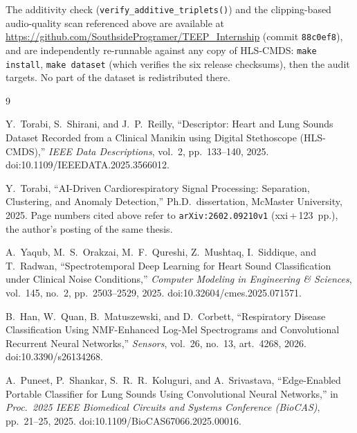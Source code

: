 \documentclass[11pt]{article}
\begin{document}
The additivity check (\texttt{verify\_additive\_triplets()}) and the
clipping-based audio-quality scan referenced above are available at
\url{https://github.com/SouthsideProgramer/TEEP_Internship} (commit
\texttt{88c0ef8}), and are independently re-runnable against any copy of
HLS-CMDS: \texttt{make install}, \texttt{make dataset} (which verifies the
six release checksums), then the audit targets. No part of the dataset is
redistributed there.

\begin{thebibliography}{9}

Y.~Torabi, S.~Shirani, and J.~P.~Reilly, ``Descriptor: Heart and Lung Sounds
Dataset Recorded from a Clinical Manikin using Digital Stethoscope
(HLS-CMDS),'' \textit{IEEE Data Descriptions}, vol.~2, pp.~133--140, 2025.
doi:10.1109/IEEEDATA.2025.3566012.

Y.~Torabi, ``AI-Driven Cardiorespiratory Signal Processing: Separation,
Clustering, and Anomaly Detection,'' Ph.D.\ dissertation, McMaster
University, 2025. Page numbers cited above refer to
\texttt{arXiv:2602.09210v1} (xxi\,+\,123~pp.), the author's posting of the
same thesis.

A.~Yaqub, M.~S.~Orakzai, M.~F.~Qureshi, Z.~Mushtaq, I.~Siddique, and
T.~Radwan, ``Spectrotemporal Deep Learning for Heart Sound Classification
under Clinical Noise Conditions,'' \textit{Computer Modeling in
Engineering \& Sciences}, vol.~145, no.~2, pp.~2503--2529, 2025.
doi:10.32604/cmes.2025.071571.

B.~Han, W.~Quan, B.~Matuszewski, and D.~Corbett, ``Respiratory Disease
Classification Using NMF-Enhanced Log-Mel Spectrograms and Convolutional
Recurrent Neural Networks,'' \textit{Sensors}, vol.~26, no.~13, art.~4268,
2026. doi:10.3390/s26134268.

A.~Puneet, P.~Shankar, S.~R.~R.~Koluguri, and A.~Srivastava,
``Edge-Enabled Portable Classifier for Lung Sounds Using Convolutional
Neural Networks,'' in \textit{Proc.\ 2025 IEEE Biomedical Circuits and
Systems Conference (BioCAS)}, pp.~21--25, 2025.
doi:10.1109/BioCAS67066.2025.00016.

\end{thebibliography}
\end{document}
